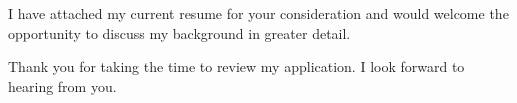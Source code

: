 \documentclass[10pt,a4paper,sans]{moderncv}
\begin{document}
{{I have attached my current resume for your consideration and would welcome the opportunity to discuss my background in greater detail.
\vspace{0.3cm}

Thank you for taking the time to review my application. I look forward to hearing from you.






}\par}


\end{document}
